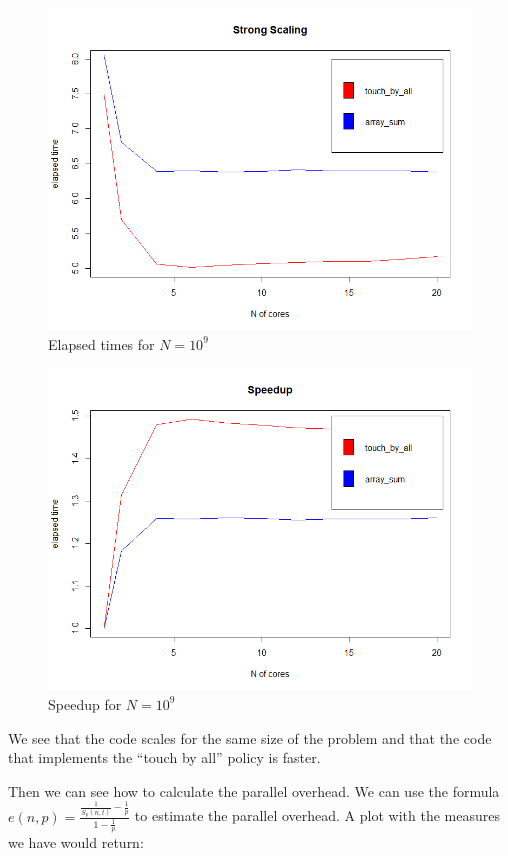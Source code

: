 \documentclass{article}
\begin{document}
\begin{figure}[H] %
	\centering
	\includegraphics[width=0.8\columnwidth]{graphs/exercise_0_strongscaling} %
	\caption{Elapsed times for $N=10^9$}
\end{figure}

\begin{figure}[H] %
	\centering
	\includegraphics[width=0.8\columnwidth]{graphs/exercise_0_speedup} %
	\caption{Speedup for $N=10^9$}
\end{figure}


We see that the code scales for the same size of the problem and that the code that implements the "`touch by all"' policy is faster.

Then we can see how to calculate the parallel overhead. We can use the formula $ e(n,p) =\frac{\frac{1}{S_p(n,t)}-\frac{1}{p}}{1-\frac{1}{p}}$ to estimate the parallel overhead. A plot with the measures we have would return:
\end{document}
